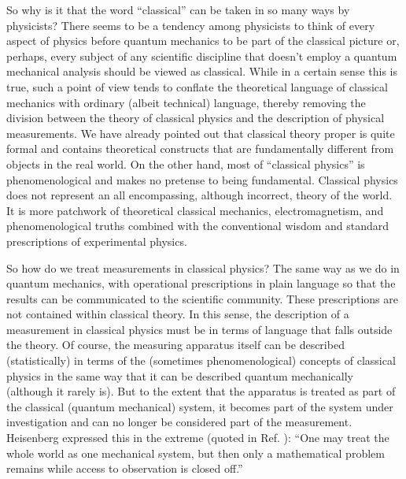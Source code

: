 \documentclass [12pt]{revtex4}
\begin{document}
So why is it that the word ``classical'' can be taken in so
many ways by physicists? There seems to be a tendency among physicists
to think of every aspect of physics before quantum mechanics to be
part of the classical picture or, perhaps, every subject of any
scientific discipline that doesn't employ a quantum mechanical
analysis should be viewed as classical.  While in a certain sense
this is true, such a point of view tends to conflate the theoretical
language of classical mechanics with ordinary (albeit technical)
language, thereby removing the division between the theory of
classical physics and the description of physical measurements.
We have already pointed out that classical theory proper is quite
formal and contains theoretical constructs that are fundamentally
different from objects in the real world.  On the other hand,
most of ``classical physics'' is phenomenological and makes no
pretense to being fundamental. Classical physics does not
represent an all encompassing, although incorrect, theory of the
world.  It is more patchwork of theoretical classical mechanics,
electromagnetism, and phenomenological truths combined with the
conventional wisdom and standard prescriptions of experimental
physics.

So how do we treat measurements in classical physics? The same way
as we do in quantum mechanics, with operational prescriptions in
plain language so that the results can be communicated to the
scientific community. These prescriptions are not contained within
classical theory. In this sense, the description of a measurement in
classical physics must be in terms of language that falls outside
the theory. Of course, the measuring apparatus itself can be
described (statistically) in terms of the (sometimes
phenomenological) concepts of classical physics in the same way that
it can be described quantum mechanically (although it rarely
is). But to the extent that the apparatus is treated as part of the
classical (quantum mechanical) system, it becomes part of the
system under investigation and can no longer be considered part of
the measurement. Heisenberg expressed this in the extreme
(quoted in Ref. \cite{SC2008}): ``One may treat the whole
world as one mechanical system, but then only a mathematical problem
remains while access to observation is closed off.''
\end{document}
